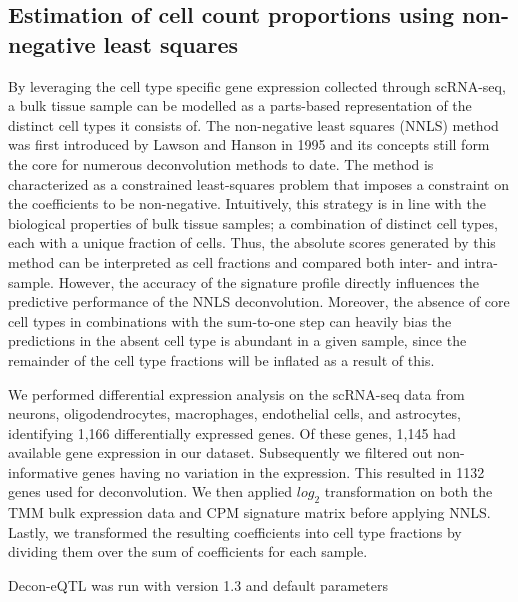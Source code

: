 {{\subsection{Estimation of cell count proportions using non-negative least squares}
By leveraging the cell type specific gene expression collected through scRNA-seq, a bulk tissue sample can be modelled as a parts-based representation of the distinct cell types it consists of. The non-negative least squares (NNLS) method was first introduced by Lawson and Hanson in 1995\cite{lawsonSolvingLeastSquares1995} and its concepts still form the core for numerous deconvolution methods to date. The method is characterized as a constrained least-squares problem that imposes a constraint on the coefficients to be non-negative. Intuitively, this strategy is in line with the biological properties of bulk tissue samples; a combination of distinct cell types, each with a unique fraction of cells. Thus, the absolute scores generated by this method can be interpreted as cell fractions and compared both inter- and intra-sample\cite{sturmComprehensiveEvaluationComputational2018}. However, the accuracy of the signature profile directly influences the predictive performance of the NNLS deconvolution. Moreover, the absence of core cell types in combinations with the sum-to-one step can heavily bias the predictions in the absent cell type is abundant in a given sample, since the remainder of the cell type fractions will be inflated as a result of this. 

We performed differential expression analysis on the scRNA-seq data from neurons, oligodendrocytes, macrophages, endothelial cells, and astrocytes, identifying 1,166 differentially expressed genes. Of these genes, 1,145 had available gene expression in our dataset. Subsequently we filtered out non-informative genes having no variation in the expression. This resulted in 1132 genes used for deconvolution. We then applied $log_2$ transformation on both the TMM bulk expression data and CPM signature matrix before applying NNLS. Lastly, we transformed the resulting coefficients into cell type fractions by dividing them over the sum of coefficients for each sample\cite{galtonRegressionMediocrityHereditary1886}. 

Decon-eQTL\cite{raulaguirregamboaDeconvolutionBulkBlood2020} was run with version 1.3 and default parameters

}}
